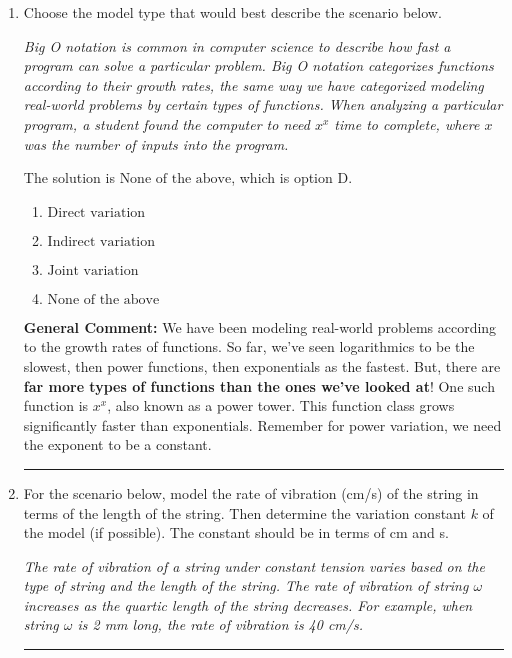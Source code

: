 \documentclass{extbook}[14pt]
\newcommand{\litem}[1]{\item #1

\rule{\textwidth}{0.4pt}}
\begin{document}
\begin{enumerate}\litem{
Choose the model type that would best describe the scenario below.

\begin{center}
    \textit{ Big O notation is common in computer science to describe how fast a program can solve a particular problem. Big O notation categorizes functions according to their growth rates, the same way we have categorized modeling real-world problems by certain types of functions. When analyzing a particular program, a student found the computer to need $x^x$ time to complete, where $x$ was the number of inputs into the program. }
\end{center}


The solution is \( \text{None of the above} \), which is option D.\begin{enumerate}[label=\Alph*.]
\item \( \text{Direct variation} \)


\item \( \text{Indirect variation} \)


\item \( \text{Joint variation} \)


\item \( \text{None of the above} \)


\end{enumerate}

\textbf{General Comment:} We have been modeling real-world problems according to the growth rates of functions. So far, we've seen logarithmics to be the slowest, then power functions, then exponentials as the fastest. But, there are \textbf{far more types of functions than the ones we've looked at}! One such function is $x^x$, also known as a power tower. This function class grows significantly faster than exponentials. Remember for power variation, we need the exponent to be a constant.
}
\litem{
For the scenario below, model the rate of vibration (cm/s) of the string in terms of the length of the string. Then determine the variation constant $k$ of the model (if possible). The constant should be in terms of cm and s.

\begin{center}
    \textit{ The rate of vibration of a string under constant tension varies based on the type of string and the length of the string. The rate of vibration of string $\omega$ increases as the quartic length of the string decreases. For example, when string $\omega$ is 2 mm long, the rate of vibration is 40 cm/s. }
\end{center}


}
\end{enumerate}
\end{document}
